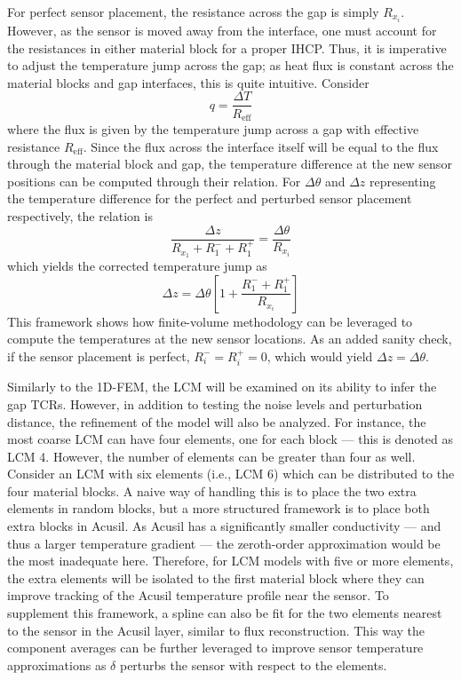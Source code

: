 For perfect sensor placement, the resistance across the gap is simply $R_{x_i}$. However, as the sensor is moved away from the interface, one must account for the resistances in either material block for a proper IHCP. Thus, it is imperative to adjust the temperature jump across the gap; as heat flux is constant across the material blocks and gap interfaces, this is quite intuitive. Consider
\begin{equation}
    q = \frac{\Delta T}{R_{\text{eff}}}
\end{equation}
where the flux is given by the temperature jump across a gap with effective resistance $R_\text{eff}$. Since the flux across the interface itself will be equal to the flux through the material block and gap, the temperature difference at the new sensor positions can be computed through their relation. For $\Delta \theta$ and $\Delta z$ representing the temperature difference for the perfect and perturbed sensor placement respectively, the relation is
\begin{equation}
    \frac{\Delta z}{R_{x_1} + R_1^- + R_1^+} = \frac{\Delta \theta}{R_{x_i}} 
\end{equation}
which yields the corrected temperature jump as
\begin{equation}
\label{eq:eff_res}
    \Delta z = \Delta \theta \left[1+\frac{R_1^- + R_1^+}{R_{x_i}}\right]
\end{equation}
This framework shows how finite-volume methodology can be leveraged to compute the temperatures at the new sensor locations. As an added sanity check, if the sensor placement is perfect, $R_i^-=R_i^+=0$, which would yield $\Delta z = \Delta \theta$.

Similarly to the 1D-FEM, the LCM will be examined on its ability to infer the gap TCRs. However, in addition to testing the noise levels and perturbation distance, the refinement of the model will also be analyzed. For instance, the most coarse LCM can have four elements, one for each block --- this is denoted as LCM 4. However, the number of elements can be greater than four as well. Consider an LCM with six elements (i.e., LCM 6) which can be distributed to the four material blocks. A naive way of handling this is to place the two extra elements in random blocks, but a more structured framework is to place both extra blocks in Acusil. As Acusil has a significantly smaller conductivity --- and thus a larger temperature gradient --- the zeroth-order approximation would be the most inadequate here. Therefore, for LCM models with five or more elements, the extra elements will be isolated to the first material block where they can improve tracking of the Acusil temperature profile near the sensor. To supplement this framework, a spline can also be fit for the two elements nearest to the sensor in the Acusil layer, similar to flux reconstruction. This way the component averages can be further leveraged to improve sensor temperature approximations as $\delta$ perturbs the sensor with respect to the elements. 

